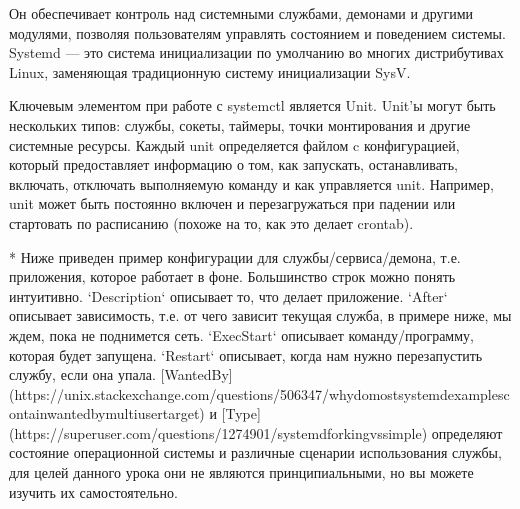 \documentclass[letterpaper,10pt,russian]{sphinxmanual}
\begin{document}
\sphinxAtStartPar
Он обеспечивает контроль над системными службами, демонами и другими модулями, позволяя пользователям управлять состоянием и поведением системы. Systemd — это система инициализации по умолчанию во многих дистрибутивах Linux, заменяющая традиционную систему инициализации SysV.

\sphinxAtStartPar
Ключевым элементом при работе с systemctl является Unit. Unit’ы могут быть нескольких типов: службы, сокеты, таймеры, точки монтирования и другие системные ресурсы. Каждый unit определяется файлом c конфигурацией, который предоставляет информацию о том, как запускать, останавливать, включать, отключать выполняемую команду и как управляется unit. Например, unit может быть постоянно включен и перезагружаться при падении или стартовать по расписанию (похоже на то, как это делает crontab).

\begin{sphinxVerbatim}[commandchars=\\\{\}]
* Ниже приведен пример конфигурации для службы/сервиса/демона, т.е. приложения, которое работает в фоне. Большинство строк можно понять интуитивно. `Description` описывает то, что делает приложение. `After` описывает зависимость, т.е. от чего зависит текущая служба, в примере ниже, мы ждем, пока не \PYGZdq{}поднимется\PYGZdq{} сеть. `ExecStart` описывает команду/программу, которая будет запущена. `Restart` описывает, когда нам нужно перезапустить службу, если она упала. [WantedBy](https://unix.stackexchange.com/questions/506347/why\PYGZhy{}do\PYGZhy{}most\PYGZhy{}systemd\PYGZhy{}examples\PYGZhy{}contain\PYGZhy{}wantedby\PYGZhy{}multi\PYGZhy{}user\PYGZhy{}target) и [Type](https://superuser.com/questions/1274901/systemd\PYGZhy{}forking\PYGZhy{}vs\PYGZhy{}simple) определяют состояние операционной системы и различные сценарии использования службы, для целей данного урока они не являются принципиальными, но вы можете изучить их самостоятельно.
\end{sphinxVerbatim}

\begin{sphinxVerbatim}[commandchars=\\\{\}]
\end{sphinxVerbatim}
\end{document}
